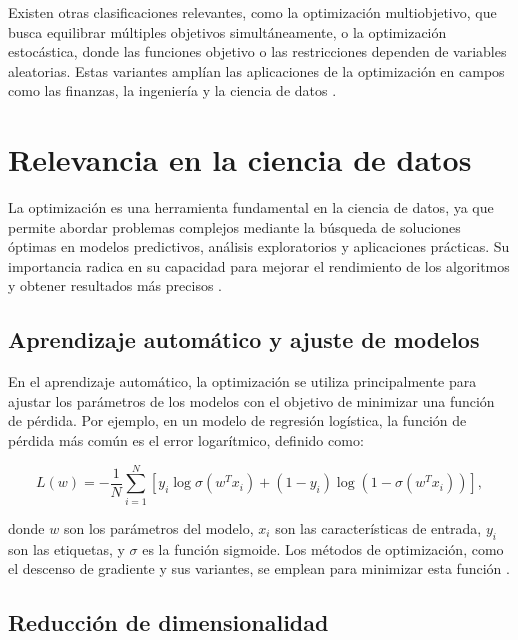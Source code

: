 Existen otras clasificaciones relevantes, como la optimización multiobjetivo, que busca equilibrar múltiples objetivos simultáneamente, o la optimización estocástica, donde las funciones objetivo o las restricciones dependen de variables aleatorias. Estas variantes amplían las aplicaciones de la optimización en campos como las finanzas, la ingeniería y la ciencia de datos \cite{goodfellow2016deep}.

\section{Relevancia en la ciencia de datos}

La optimización es una herramienta fundamental en la ciencia de datos, ya que permite abordar problemas complejos mediante la búsqueda de soluciones óptimas en modelos predictivos, análisis exploratorios y aplicaciones prácticas. Su importancia radica en su capacidad para mejorar el rendimiento de los algoritmos y obtener resultados más precisos \cite{goodfellow2016deep}.

\subsection{Aprendizaje automático y ajuste de modelos}

En el aprendizaje automático, la optimización se utiliza principalmente para ajustar los parámetros de los modelos con el objetivo de minimizar una función de pérdida. Por ejemplo, en un modelo de regresión logística, la función de pérdida más común es el error logarítmico, definido como:

\begin{equation}
	L(w) = -\frac{1}{N} \sum_{i=1}^N \left[ y_i \log \sigma(w^T x_i) + (1 - y_i) \log (1 - \sigma(w^T x_i)) \right],
\end{equation}

donde \(w\) son los parámetros del modelo, \(x_i\) son las características de entrada, \(y_i\) son las etiquetas, y \(\sigma\) es la función sigmoide. Los métodos de optimización, como el descenso de gradiente y sus variantes, se emplean para minimizar esta función \cite{boyd2004convex}.

\subsection{Reducción de dimensionalidad}

